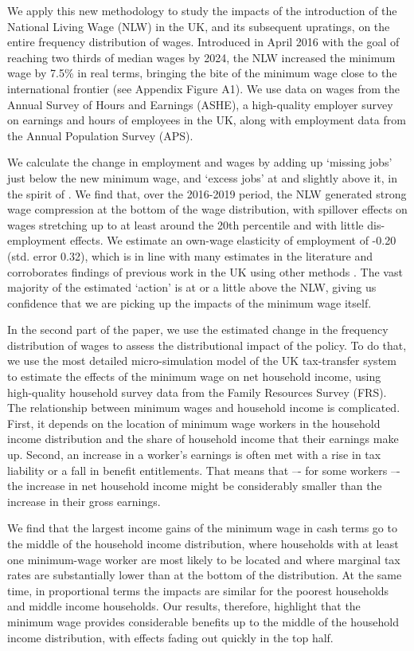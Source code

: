 We apply this new methodology to study the impacts of the introduction of the National Living Wage (NLW) in the UK, and its subsequent upratings, on the entire frequency distribution of wages. Introduced in April 2016 with the goal of reaching two thirds of median wages by 2024, the NLW increased the minimum wage by 7.5\% in real terms, bringing the bite of the minimum wage close to the international frontier (see Appendix Figure A1). We use data on wages from the Annual Survey of Hours and Earnings (ASHE), a high-quality employer survey on earnings and hours of employees in the UK, along with employment data from the Annual Population Survey (APS). 

We calculate the change in employment and wages by adding up `missing jobs' just below the new minimum wage, and `excess jobs' at and slightly above it, in the spirit of \cite{Cengiz2019}. We find that, over the 2016-2019 period, the NLW generated strong wage compression at the bottom of the wage distribution, with spillover effects on wages stretching up to at least around the 20th percentile and with little dis-employment effects. We estimate an own-wage elasticity of employment of -0.20 (std. error 0.32), which is in line with many estimates in the literature and corroborates findings of previous work in the UK using other methods \citep{Dube2019b}. The vast majority of the estimated `action' is at or a little above the NLW, giving us confidence that we are picking up the impacts of the minimum wage itself.


In the second part of the paper, we use the estimated change in the frequency distribution of wages to assess the distributional impact of the policy. To do that, we use the most detailed micro-simulation model of the UK tax-transfer system \citep{Waters2017} to estimate the effects of the minimum wage on net household income, using high-quality household survey data from the Family Resources Survey (FRS). The relationship between minimum wages and household income is complicated. First, it depends on the location of minimum wage workers in the household income distribution and the share of household income that their earnings make up. Second, an increase in a worker’s earnings is often met with a rise in tax liability or a fall in benefit entitlements. That means that –- for some workers –- the increase in net household income might be considerably smaller than the increase in their gross earnings. 

We find that the largest income gains of the minimum wage in cash terms go to the middle of the household income distribution, where households with at least one minimum-wage worker are most likely to be located and where marginal tax rates are substantially lower than at the bottom of the distribution. At the same time, in proportional terms the impacts are similar for the poorest households and middle income households. Our results, therefore, highlight that the minimum wage provides considerable benefits up to the middle of the household income distribution, with effects fading out quickly in the top half.

